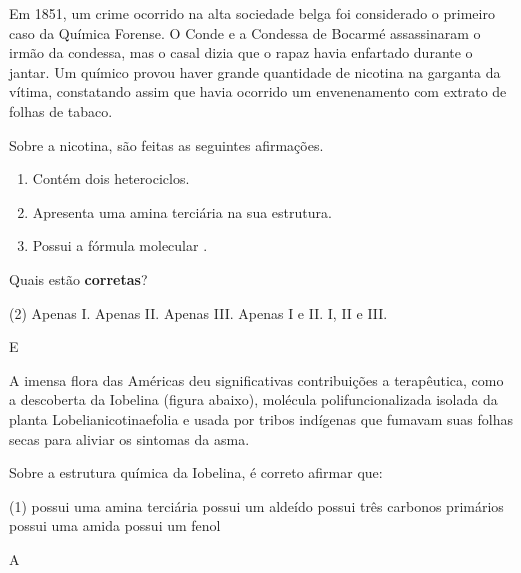 \documentclass[11pt]{scrartcl}
\begin{document}
\begin{exercise}[points=1.0]
Em 1851, um crime ocorrido na alta sociedade belga foi considerado o primeiro caso da Química Forense. O Conde e a Condessa de Bocarmé assassinaram o irmão da condessa, mas o casal dizia que o rapaz havia enfartado durante o jantar. Um químico provou haver grande quantidade de nicotina na garganta da vítima, constatando assim que havia ocorrido um envenenamento com extrato de folhas de tabaco.

Sobre a nicotina, são feitas as seguintes afirmações.

\begin{enumerate}[label=\Roman*]
\item Contém dois heterociclos.
\item Apresenta uma amina terciária na sua estrutura.
\item Possui a fórmula molecular .
\end{enumerate}

Quais estão \textbf{corretas}?


\begin{choice}(2)
\choice Apenas I.
\choice Apenas II.
\choice Apenas III.
\choice Apenas I e II.
\choice I, II e III.
\end{choice}
\end{exercise}
\begin{solution}
E
\end{solution}




\begin{exercise}[points=1.0]
A imensa flora das Américas deu significativas contribuições a terapêutica, como a descoberta da Iobelina (figura abaixo), molécula polifuncionalizada isolada da planta Lobelianicotinaefolia e usada por tribos indígenas que fumavam suas folhas secas para aliviar os sintomas da asma.


\centerline{
}

Sobre a estrutura química da Iobelina, é correto afirmar que:


\begin{choice}(1)
\choice possui uma amina terciária
\choice possui um aldeído
\choice possui três carbonos primários
\choice possui uma amida
\choice possui um fenol
\end{choice}
\end{exercise}
\begin{solution}
A
\end{solution}
\end{document}

